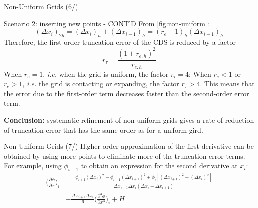 \begin{frame}[fragile]{Non-Uniform Grids (6/)}
\begin{block}{Scenario 2: inserting new points - CONT'D}\small
From \autoref{fig:non-uniform}:
    \[
    (\Delta x_{i})_{2h} = (\Delta x_{i})_{h} + (\Delta x_{i-1})_{h} = (r_{e}+1)_{h}(\Delta x_{i-1})_{h}
    \]
Therefore, the first-order truncation error of the CDS is reduced by a factor 
    \[
    r_{\tau} = \frac{(1+r_{e,h})^{2}}{r_{e,h}}
    \]
    When $r_{e} =1$, \textit{i.e.} when the grid is uniform, the factor $r_{\tau} = 4$; When $r_{e} < 1$ or $r_{e} > 1$, \textit{i.e.} the grid is contacting or expanding, the factor $r_{\tau}>4$. This means that the error due to the first-order term decreases faster than the second-order error term.
\end{block}
\textbf{Conclusion:} systematic refinement of non-uniform grids gives a rate of reduction of truncation error that has the same order as for a uniform gird.
\end{frame}

\begin{frame}[fragile]{Non-Uniform Grids (7/)}
Higher order approximation of the first derivative can be obtained by using more points to eliminate more of the truncation error terms. For example, using $\phi_{i-1}$ to obtain an expression for the second derivative at $x_{i}$:
    \begin{align*}
    \bigg( \frac{\partial \phi}{\partial x} \bigg)_{i} 
    & = \frac{\phi_{i+1}(\Delta x_{i})^{2}-\phi_{i-1}(\Delta x_{i+1})^{2} + \phi_{i}[(\Delta x_{i+1})^{2}-(\Delta x_{i})^{2}]}{\Delta x_{i+1}\Delta x_{i}(\Delta x_{i}+\Delta x_{i+1})} \\
    & - \frac{\Delta x_{i+1}\Delta x_{i}}{6}\bigg( \frac{\partial^{3} \phi}{\partial x^{3}} \bigg)_{i} + H
    \end{align*}
\end{frame}
